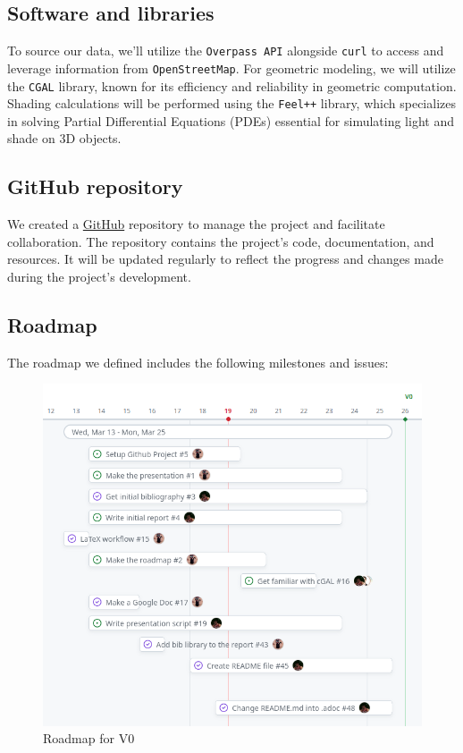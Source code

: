 \documentclass[12pt]{article}
\begin{document}
\subsection{Software and libraries}
To source our data, we'll utilize the \texttt{Overpass API} \cite{overpass} alongside
\texttt{curl} \cite{curl} to access and leverage information from \texttt{OpenStreetMap}.
For geometric modeling, we will utilize the \texttt{CGAL} library, known for its efficiency and
reliability in geometric computation\cite{cgal}. Shading calculations will be performed using the
\texttt{Feel++} \cite{feel++} library, which specializes in solving Partial Differential Equations (PDEs)
essential for simulating light and shade on 3D objects.

\subsection{GitHub repository}
We created a \href{https://github.com/master-csmi/2024-m1-vegetation}{GitHub} repository to manage the project and facilitate collaboration.
The repository contains the project's code, documentation, and resources. It will be
updated regularly to reflect the progress and changes made during the project's
development.

\subsection{Roadmap}
The roadmap we defined includes the following milestones and issues:

\begin{figure}[H]
    \centering
    \includegraphics[width=1\textwidth]{images/roadmap_v0.png}
    \caption{Roadmap for V0}
\end{figure}
\end{document}
